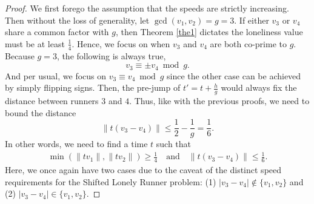 \documentclass[11pt]{amsart}
\newcommand{\norm}[1]{\lVert #1 \rVert}
\begin{document}
\begin{proof}
    We first forego the assumption that the speeds are strictly increasing. Then without the loss of generality, let $\gcd(v_1,v_2) = g = 3$. If either $v_3$ or $v_4$ share a common factor with $g$, then Theorem \ref{the1} dictates the loneliness value must be at least $\frac{1}{4}$. Hence, we focus on when $v_3$ and $v_4$ are both co-prime to $g$. Because $g = 3$, the following is always true,
    $$v_3 \equiv \pm v_4 \bmod g.$$
    And per usual, we focus on $v_3 \equiv v_4 \bmod g$ since the other case can be achieved by simply flipping signs. Then, the pre-jump of $t' = t + \frac{h}{g}$ would always fix the distance between runners $3$ and $4$. Thus, like with the previous proofs, we need to bound the distance
    $$\norm{t(v_3 - v_4)} \leq \frac{1}{2} - \frac{1}{g} = \frac{1}{6}.$$
    In other words, we need to find a time $t$ such that
    \begin{align*}\min(\norm{tv_1},\norm{tv_2}) \geq \frac{1}{4} \quad \text{and} \quad \norm{t(v_3 - v_4)} \leq \frac{1}{6}.\end{align*}
    Here, we once again have two cases due to the caveat of the distinct speed requirements for the Shifted Lonely Runner problem: (1) $|v_3 - v_4| \not\in \{v_1, v_2\}$ and (2) $|v_3 - v_4| \in \{v_1,v_2\}$.


\end{proof}
\end{document}
